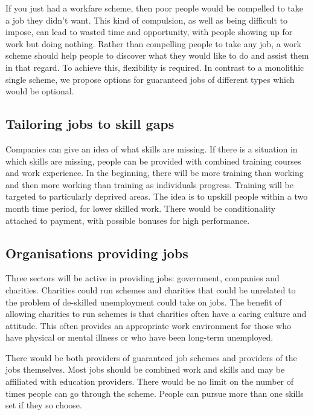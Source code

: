 \documentclass[]{tufte-handout}
\begin{document}
If you just had a workfare scheme, then poor people would be compelled
to take a job they didn't want. This kind of compulsion, as well as
being difficult to impose, can lead to wasted time and opportunity, with
people showing up for work but doing nothing. Rather than compelling
people to take any job, a work scheme should help people to discover
what they would like to do and assist them in that regard. To achieve
this, flexibility is required. In contrast to a monolithic single
scheme, we propose options for guaranteed jobs of different types which
would be optional.

\hypertarget{tailoring-jobs-to-skill-gaps}{%
\subsection{Tailoring jobs to skill
gaps}\label{tailoring-jobs-to-skill-gaps}}

Companies can give an idea of what skills are missing. If there is a
situation in which skills are missing, people can be provided with
combined training courses and work experience. In the beginning, there
will be more training than working and then more working than training
as individuals progress. Training will be targeted to particularly
deprived areas. The idea is to upskill people within a two month time
period, for lower skilled work. There would be conditionality attached
to payment, with possible bonuses for high performance.

\hypertarget{organisations-providing-jobs}{%
\subsection{Organisations providing
jobs}\label{organisations-providing-jobs}}

Three sectors will be active in providing jobs: government, companies
and charities. Charities could run schemes and charities that could be
unrelated to the problem of de-skilled unemployment could take on jobs.
The benefit of allowing charities to run schemes is that charities often
have a caring culture and attitude. This often provides an appropriate
work environment for those who have physical or mental illness or who
have been long-term unemployed.

There would be both providers of guaranteed job schemes and providers of
the jobs themselves. Most jobs should be combined work and skills and
may be affiliated with education providers. There would be no limit on
the number of times people can go through the scheme. People can pursue
more than one skills set if they so choose.
\end{document}
